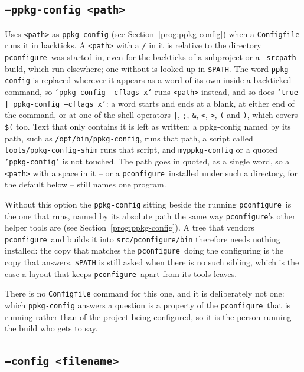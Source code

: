 \documentclass{article}
\newcommand{\pconfigure}{\texttt{pconfigure}}
\begin{document}
\subsection{\texttt{--ppkg-config <path>} \label{cl:ppkg_config}}

Uses \texttt{<path>} as \texttt{ppkg-config} (see
Section~\ref{prog:ppkg-config}) when a \texttt{Configfile} runs it in
backticks.  A \texttt{<path>} with a \texttt{/} in it is relative to
the directory \pconfigure\ was started in, even for the backticks of
a subproject or a \texttt{--srcpath} build, which run elsewhere; one
without is looked up in \texttt{\$PATH}.  The word \texttt{ppkg-config} is replaced wherever it
appears as a word of its own inside a backticked command, so
\texttt{`ppkg-config --cflags x`} runs \texttt{<path>} instead, and
so does \texttt{`true | ppkg-config --cflags x`}: a word starts and
ends at a blank, at either end of the command, or at one of the shell
operators \texttt{|}, \texttt{;}, \texttt{\&}, \texttt{<},
\texttt{>}, \texttt{(} and \texttt{)}, which covers \texttt{\$(}
too.  Text that only contains it is left as written: a ppkg-config
named by its path, such as \texttt{/opt/bin/ppkg-config}, runs that
path, a script called \texttt{tools/ppkg-config-shim} runs that
script, and \texttt{myppkg-config} or a quoted
\texttt{'ppkg-config'} is not touched.  The path goes in quoted, as a
single word, so a \texttt{<path>} with a space in it -- or a
\pconfigure\ installed under such a directory, for the default below
-- still names one program.

Without this option the \texttt{ppkg-config} sitting beside the
running \pconfigure\ is the one that runs, named by its absolute path
the same way \pconfigure's other helper tools are (see
Section~\ref{prog:ppkg-config}).  A tree that vendors \pconfigure\ and
builds it into \texttt{src/pconfigure/bin} therefore needs nothing
installed: the copy that matches the \pconfigure\ doing the
configuring is the copy that answers.  \texttt{\$PATH} is still asked
when there is no such sibling, which is the case a layout that keeps
\pconfigure\ apart from its tools leaves.

There is no \texttt{Configfile} command for this one, and it is
deliberately not one: which \texttt{ppkg-config} answers a question is
a property of the \pconfigure\ that is running rather than of the
project being configured, so it is the person running the build who
gets to say.

\subsection{\texttt{--config <filename>}}
\end{document}

